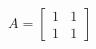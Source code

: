 \documentclass[preview]{standalone}
\begin{document}
\begin{center}
$\displaystyle A=\left[\begin{matrix}1 & 1\\1 & 1\end{matrix}\right]$
\end{center}
\end{document}
